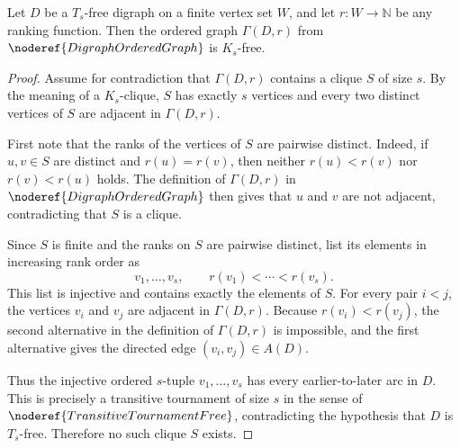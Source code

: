 \begin{helper}
Let \(D\) be a \(T_s\)-free digraph on a finite vertex set \(W\), and let \(r:W\to\mathbb N\) be any ranking function. Then the ordered graph \(\Gamma(D,r)\) from \(\noderef{DigraphOrderedGraph}\) is \(K_s\)-free.
\end{helper}
\begin{proof}
Assume for contradiction that \(\Gamma(D,r)\) contains a clique \(S\) of size \(s\). By the meaning of a \(K_s\)-clique, \(S\) has exactly \(s\) vertices and every two distinct vertices of \(S\) are adjacent in \(\Gamma(D,r)\).

First note that the ranks of the vertices of \(S\) are pairwise distinct. Indeed, if \(u,v\in S\) are distinct and \(r(u)=r(v)\), then neither \(r(u)<r(v)\) nor \(r(v)<r(u)\) holds. The definition of \(\Gamma(D,r)\) in \(\noderef{DigraphOrderedGraph}\) then gives that \(u\) and \(v\) are not adjacent, contradicting that \(S\) is a clique.

Since \(S\) is finite and the ranks on \(S\) are pairwise distinct, list its elements in increasing rank order as
\[
  v_1,\ldots,v_s,
  \qquad
  r(v_1)<\cdots<r(v_s).
\]
This list is injective and contains exactly the elements of \(S\). For every pair \(i<j\), the vertices \(v_i\) and \(v_j\) are adjacent in \(\Gamma(D,r)\). Because \(r(v_i)<r(v_j)\), the second alternative in the definition of \(\Gamma(D,r)\) is impossible, and the first alternative gives the directed edge \((v_i,v_j)\in A(D)\).

Thus the injective ordered \(s\)-tuple \(v_1,\ldots,v_s\) has every earlier-to-later arc in \(D\). This is precisely a transitive tournament of size \(s\) in the sense of \(\noderef{TransitiveTournamentFree}\), contradicting the hypothesis that \(D\) is \(T_s\)-free. Therefore no such clique \(S\) exists.
\end{proof}
